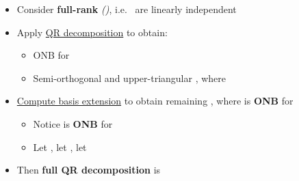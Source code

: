\begin{itemize}

      \item
            Consider \textbf{full-rank}
            \emph{()},
            i.e.~
            are linearly independent
      \item
            Apply \underline{QR decomposition} to obtain:

            \begin{itemize}

                  \item
                        ONB
                        for 
                  \item
                        Semi-orthogonal
                        and upper-triangular ,
                        where 
            \end{itemize}
      \item
            \underline{Compute basis extension} to obtain remaining
            ,
            where 
            is \textbf{ONB} for 

            \begin{itemize}

                  \item
                        Notice
                         is
                        \textbf{ONB} for 
                  \item
                        Let
                        ,
                        let , let
            \end{itemize}
      \item
            Then \textbf{full QR decomposition} is


\end{itemize}
